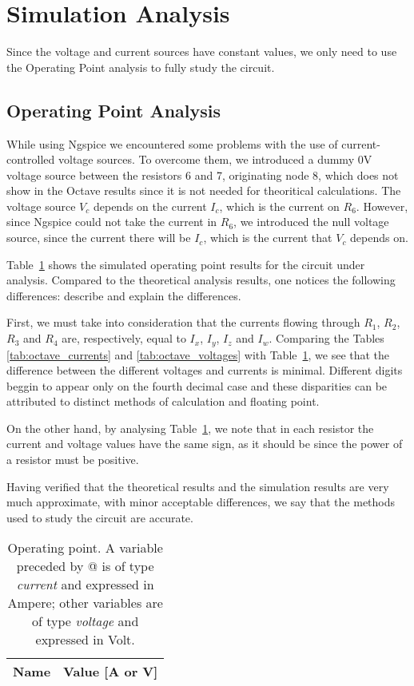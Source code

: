 \section{Simulation Analysis}
\label{sec:simulation}
\tab Since the voltage and current sources have constant values, we only need to use the Operating Point analysis to fully study the circuit.

\subsection{Operating Point Analysis}
\label{subsec:op_analysis}

\tab While using Ngspice we encountered some problems with the use of current-controlled voltage sources. To overcome them, we introduced a dummy 0V voltage source between the resistors 6 and 7, originating node 8, which does not show in the Octave results since it is not needed for theoritical calculations.
The voltage source $V_c$ depends on the current $I_c$, which is the current on $R_6$. However, since Ngspice could not take the current in $R_6$, we introduced the null voltage source, since the current there will be $I_c$, which is the current that $V_c$ depends on.

Table~\ref{tab:op} shows the simulated operating point results for the circuit
under analysis. Compared to the theoretical analysis results, one notices the
following differences: describe and explain the differences.

First, we must take into consideration that the currents flowing through $R_1$, $R_2$, $R_3$ and $R_4$ are, respectively, equal to $I_x$, $I_y$, $I_z$ and $I_w$.
Comparing the Tables \ref{tab:octave_currents} and \ref{tab:octave_voltages} with Table~\ref{tab:op}, we see that the difference between the different voltages and currents is minimal. Different digits beggin to appear only on the fourth decimal case and these disparities can be attributed to distinct methods of calculation and floating point.\par
On the other hand, by analysing Table~\ref{tab:op}, we note that in each resistor the current and voltage values have the same sign, as it should be since the power of a resistor must be positive. \par
Having verified that the theoretical results and the simulation results are very much approximate, with minor acceptable differences, we say that the methods used to study the circuit are accurate.


\begin{table}[h]
  \centering
  \begin{tabular}{|l|r|}
    \hline    
    {\bf Name} & {\bf Value [A or V]} \\ \hline
    
  \end{tabular}
  \caption{Operating point. A variable preceded by @ is of type {\em current}
    and expressed in Ampere; other variables are of type {\it voltage} and expressed in
    Volt.}
  \label{tab:op}
\end{table}



